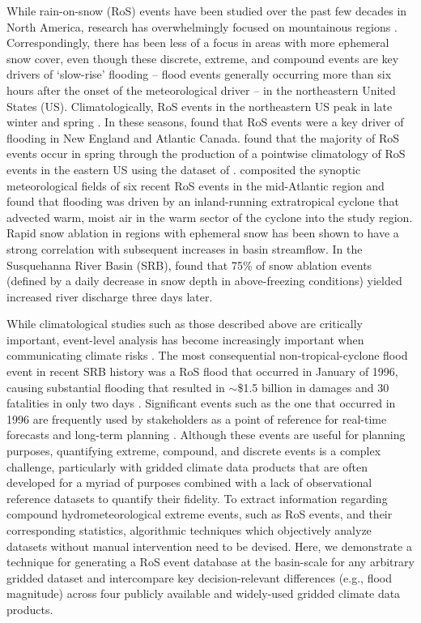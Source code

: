 \documentclass[draft]{agujournal2019}
\begin{document}
While rain-on-snow (RoS) events have been studied over the past few decades in North America, research has overwhelmingly focused on mountainous regions \citep{singh1997hydrological,mccabe2007rain,musselman2018projected}. 
Correspondingly, there has been less of a focus in areas with more ephemeral snow cover, even though these discrete, extreme, and compound events are key drivers of `slow-rise' flooding -- flood events generally occurring more than six hours after the onset of the meteorological driver \citep{dougherty2021high} -- in the northeastern United States (US). 
Climatologically, RoS events in the northeastern US peak in late winter and spring \citep{ashley2008flood,villarini2010flood,dougherty2019climatology}. 
In these seasons, \citet{collins2014annual} found that RoS events were a key driver of flooding in New England and Atlantic Canada. 
\citet{wachowicz2020rain} found that the majority of RoS events occur in spring through the production of a pointwise climatology of RoS events in the eastern US using the dataset of \citet{dyer2006spatial}. \citet{grote2021synoptic} composited the synoptic meteorological fields of six recent RoS events in the mid-Atlantic region and found that flooding was driven by an inland-running extratropical cyclone that advected warm, moist air in the warm sector of the cyclone into the study region. 
Rapid snow ablation in regions with ephemeral snow has been shown to have a strong correlation with subsequent increases in basin streamflow. 
In the Susquehanna River Basin (SRB), \citet{suriano2020discharge} found that 75\% of snow ablation events (defined by a daily decrease in snow depth in above-freezing conditions) yielded increased river discharge three days later.

While climatological studies such as those described above are critically important, event-level analysis has become increasingly important when communicating climate risks \citep{shepherd2018storylines}. 
The most consequential non-tropical-cyclone flood event in recent SRB history was a RoS flood that occurred in January of 1996, causing substantial flooding that resulted in $\sim$\$1.5 billion in damages and 30 fatalities in only two days \citep{leathers1998severe}.
Significant events such as the one that occurred in 1996 are frequently used by stakeholders as a point of reference for real-time forecasts and long-term planning \citep{george2019the}. 
Although these events are useful for planning purposes, quantifying extreme, compound, and discrete events is a complex challenge, particularly with gridded climate data products that are often developed for a myriad of purposes combined with a lack of observational reference datasets to quantify their fidelity. 
To extract information regarding compound hydrometeorological extreme events, such as RoS events, and their corresponding statistics, algorithmic techniques which objectively analyze datasets without manual intervention need to be devised.
Here, we demonstrate a technique for generating a RoS event database at the basin-scale for any arbitrary gridded dataset and intercompare key decision-relevant differences (e.g., flood magnitude) across four publicly available and widely-used gridded climate data products. 
\end{document}
